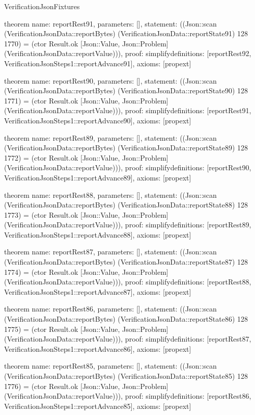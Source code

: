 \begin{lexlean}{VerificationJsonFixtures}
\begin{semanticmodule}
theorem{
  name: reportRest91,
  parameters: [],
  statement: ((Json::scan (VerificationJsonData::reportBytes) (VerificationJsonData::reportState91) 128 1770) = (ctor Result.ok [Json::Value, Json::Problem] (VerificationJsonData::reportValue))),
  proof: simplify{definitions: [reportRest92, VerificationJsonSteps1::reportAdvance91]},
  axioms: [propext]
}

theorem{
  name: reportRest90,
  parameters: [],
  statement: ((Json::scan (VerificationJsonData::reportBytes) (VerificationJsonData::reportState90) 128 1771) = (ctor Result.ok [Json::Value, Json::Problem] (VerificationJsonData::reportValue))),
  proof: simplify{definitions: [reportRest91, VerificationJsonSteps1::reportAdvance90]},
  axioms: [propext]
}

theorem{
  name: reportRest89,
  parameters: [],
  statement: ((Json::scan (VerificationJsonData::reportBytes) (VerificationJsonData::reportState89) 128 1772) = (ctor Result.ok [Json::Value, Json::Problem] (VerificationJsonData::reportValue))),
  proof: simplify{definitions: [reportRest90, VerificationJsonSteps1::reportAdvance89]},
  axioms: [propext]
}

theorem{
  name: reportRest88,
  parameters: [],
  statement: ((Json::scan (VerificationJsonData::reportBytes) (VerificationJsonData::reportState88) 128 1773) = (ctor Result.ok [Json::Value, Json::Problem] (VerificationJsonData::reportValue))),
  proof: simplify{definitions: [reportRest89, VerificationJsonSteps1::reportAdvance88]},
  axioms: [propext]
}

theorem{
  name: reportRest87,
  parameters: [],
  statement: ((Json::scan (VerificationJsonData::reportBytes) (VerificationJsonData::reportState87) 128 1774) = (ctor Result.ok [Json::Value, Json::Problem] (VerificationJsonData::reportValue))),
  proof: simplify{definitions: [reportRest88, VerificationJsonSteps1::reportAdvance87]},
  axioms: [propext]
}

theorem{
  name: reportRest86,
  parameters: [],
  statement: ((Json::scan (VerificationJsonData::reportBytes) (VerificationJsonData::reportState86) 128 1775) = (ctor Result.ok [Json::Value, Json::Problem] (VerificationJsonData::reportValue))),
  proof: simplify{definitions: [reportRest87, VerificationJsonSteps1::reportAdvance86]},
  axioms: [propext]
}

theorem{
  name: reportRest85,
  parameters: [],
  statement: ((Json::scan (VerificationJsonData::reportBytes) (VerificationJsonData::reportState85) 128 1776) = (ctor Result.ok [Json::Value, Json::Problem] (VerificationJsonData::reportValue))),
  proof: simplify{definitions: [reportRest86, VerificationJsonSteps1::reportAdvance85]},
  axioms: [propext]
}


\end{semanticmodule}
\end{lexlean}
